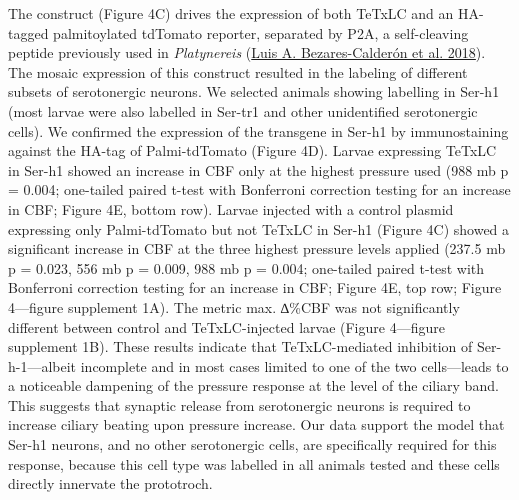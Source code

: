 \documentclass[
]{article}
\begin{document}
The construct (Figure 4C) drives the expression of both TeTxLC and an
HA-tagged palmitoylated tdTomato reporter, separated by P2A, a
self-cleaving peptide previously used in \emph{Platynereis}
(\protect\hyperlink{ref-bezares-calderon2018}{Luis A. Bezares-Calderón
et al. 2018}). The mosaic expression of this construct resulted in the
labeling of different subsets of serotonergic neurons. We selected
animals showing labelling in Ser-h1 (most larvae were also labelled in
Ser-tr1 and other unidentified serotonergic cells). We confirmed the
expression of the transgene in Ser-h1 by immunostaining against the
HA-tag of Palmi-tdTomato (Figure 4D). Larvae expressing TeTxLC in Ser-h1
showed an increase in CBF only at the highest pressure used (988 mb p =
0.004; one-tailed paired t-test with Bonferroni correction testing for
an increase in CBF; Figure 4E, bottom row). Larvae injected with a
control plasmid expressing only Palmi-tdTomato but not TeTxLC in Ser-h1
(Figure 4C) showed a significant increase in CBF at the three highest
pressure levels applied (237.5 mb p = 0.023, 556 mb p = 0.009, 988 mb p
= 0.004; one-tailed paired t-test with Bonferroni correction testing for
an increase in CBF; Figure 4E, top row; Figure 4---figure supplement
1A). The metric max. ∆\%CBF was not significantly different between
control and TeTxLC-injected larvae (Figure 4---figure supplement 1B).
These results indicate that TeTxLC-mediated inhibition of
Ser-h-1---albeit incomplete and in most cases limited to one of the two
cells---leads to a noticeable dampening of the pressure response at the
level of the ciliary band. This suggests that synaptic release from
serotonergic neurons is required to increase ciliary beating upon
pressure increase. Our data support the model that Ser-h1 neurons, and
no other serotonergic cells, are specifically required for this
response, because this cell type was labelled in all animals tested and
these cells directly innervate the prototroch.
\end{document}
